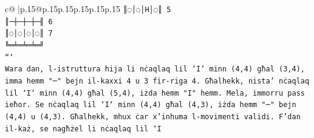 \documentclass{article}
\begin{document}
{\begin{supertabular}{c@{$\;$}|p{.15\linewidth}@{}p{.15\linewidth}p{.15\linewidth}p{.15\linewidth}p{.15\linewidth}p{.15\linewidth}}
{{{\texttt{║◌│◌│H│◌║ 5} \\
\texttt{║─┼─┼─┼─╢ 6} \\
\texttt{║◌│◌│◌│◌║ 7} \\
\texttt{╚═╧═╧═╧═╝} \\
\texttt{```} \\
\texttt{Wara dan, l{-}istruttura hija li nċaqlaq lil `I` minn (4,4) għal (3,4), imma hemm "─" bejn il{-}kaxxi 4 u 3 fir{-}riga 4. Għalhekk, nista' nċaqlaq lil `I` minn (4,4) għal (5,4), iżda hemm "I" hemm. Mela, immorru pass ieħor. Se nċaqlaq lil `I` minn (4,4) għal (4,3), iżda hemm "─" bejn (4,4) u (4,3). Għalhekk, mhux ċar x'inhuma l{-}movimenti validi. F'dan il{-}każ, se nagħżel li nċaqlaq lil `I} \\
            }
        }
    }
     \\ \\


\end{supertabular}}
\end{document}
